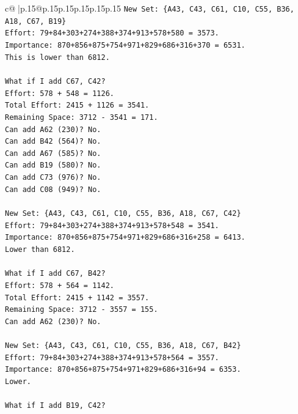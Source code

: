 \documentclass{article}
\begin{document}
{\begin{supertabular}{c@{$\;$}|p{.15\linewidth}@{}p{.15\linewidth}p{.15\linewidth}p{.15\linewidth}p{.15\linewidth}p{.15\linewidth}}
{{{\texttt{New Set: \{A43, C43, C61, C10, C55, B36, A18, C67, B19\}} \\
\texttt{Effort: 79+84+303+274+388+374+913+578+580 = 3573.} \\
\texttt{Importance: 870+856+875+754+971+829+686+316+370 = 6531.} \\
\texttt{This is lower than 6812.} \\
\\ 
\texttt{What if I add C67, C42?} \\
\texttt{Effort: 578 + 548 = 1126.} \\
\texttt{Total Effort: 2415 + 1126 = 3541.} \\
\texttt{Remaining Space: 3712 {-} 3541 = 171.} \\
\texttt{Can add A62 (230)? No.} \\
\texttt{Can add B42 (564)? No.} \\
\texttt{Can add A67 (585)? No.} \\
\texttt{Can add B19 (580)? No.} \\
\texttt{Can add C73 (976)? No.} \\
\texttt{Can add C08 (949)? No.} \\
\\ 
\texttt{New Set: \{A43, C43, C61, C10, C55, B36, A18, C67, C42\}} \\
\texttt{Effort: 79+84+303+274+388+374+913+578+548 = 3541.} \\
\texttt{Importance: 870+856+875+754+971+829+686+316+258 = 6413.} \\
\texttt{Lower than 6812.} \\
\\ 
\texttt{What if I add C67, B42?} \\
\texttt{Effort: 578 + 564 = 1142.} \\
\texttt{Total Effort: 2415 + 1142 = 3557.} \\
\texttt{Remaining Space: 3712 {-} 3557 = 155.} \\
\texttt{Can add A62 (230)? No.} \\
\\ 
\texttt{New Set: \{A43, C43, C61, C10, C55, B36, A18, C67, B42\}} \\
\texttt{Effort: 79+84+303+274+388+374+913+578+564 = 3557.} \\
\texttt{Importance: 870+856+875+754+971+829+686+316+94 = 6353.} \\
\texttt{Lower.} \\
\\ 
\texttt{What if I add B19, C42?} \\
}}}
\end{supertabular}}
\end{document}
